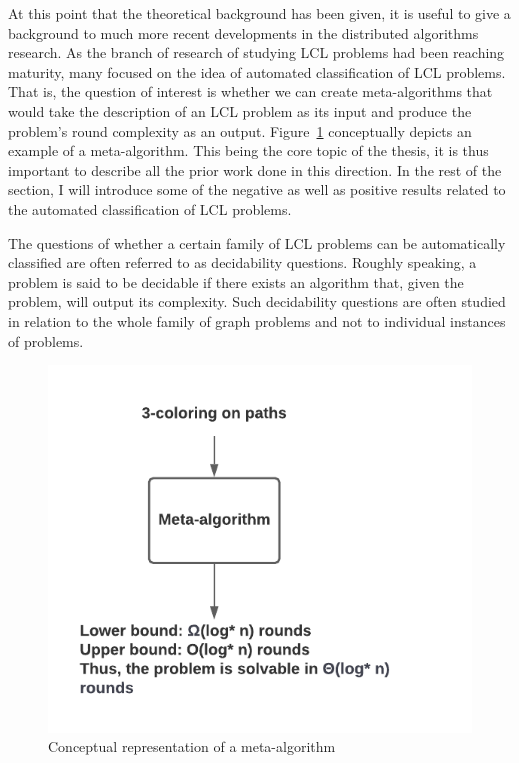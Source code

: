 At this point that the theoretical background has been given, it is
useful to give a background to much more recent developments in the
distributed algorithms research. As the branch of research of
studying LCL problems had been reaching maturity, many focused
on the idea of automated classification of LCL problems. That is,
the question of interest is whether we can create meta-algorithms
that would take the description of an LCL problem as its input
and produce the problem's round complexity as an output.
Figure~\ref{fig:meta-algorithm} conceptually depicts
an example of a meta-algorithm.
This being the core topic of the thesis, it is thus important
to describe all the prior work done in this direction.
In the rest of the
section, I will introduce some of the negative as well as positive results
related to the automated classification of LCL problems.

The questions of whether a certain family of LCL problems
can be automatically classified are often referred to
as decidability questions. Roughly speaking, a problem is
said to be decidable if there exists an algorithm that,
given the problem, will output its complexity. Such decidability
questions are often studied in relation to the whole
family of graph problems and not to individual instances
of problems.

\begin{figure}[ht]
  \begin{center}
    \includegraphics[width=\textwidth]{images/meta-algorithm.pdf}
    \caption{Conceptual representation of a meta-algorithm}
    \label{fig:meta-algorithm}
  \end{center}
\end{figure}


